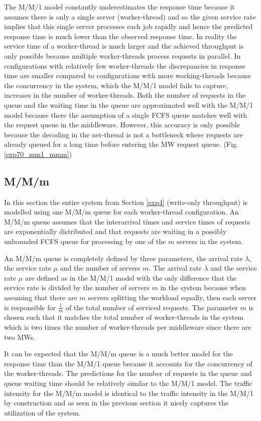 \documentclass[report.tex]{subfiles}
\begin{document}
The M/M/1 model constantly underestimates the response time because it assumes there is only a single server (worker-thread) and so the given service rate implies that this single server processes each job rapidly and hence the predicted response time is much lower than the observed response time. In reality the service time of a worker-thread is much larger and the achieved throughput is only possible because multiple worker-threads process requests in parallel.
In configurations with relatively few worker-threads the discrepancies in response time are smaller compared to configurations with more working-threads because the concurrency in the system, which the M/M/1 model fails to capture, increases in the number of worker-threads.
Both the number of requests in the queue and the waiting time in the queue are approximated well with the M/M/1 model because there the assumption of a single FCFS queue matches well with the request queue in the middleware. However, this accuracy is only possible because the decoding in the net-thread is not a bottleneck where requests are already queued for a long time before entering the MW request queue. (Fig. \ref{exp70_mm1_mmm})

\subsection{M/M/m}

In this section the entire system from Section \ref{exp4} (write-only throughput) is modelled using one M/M/m queue for each worker-thread configuration. An M/M/m queue assumes that the interarrival times and service times of requests are exponentially distributed and that requests are waiting in a possibly unbounded FCFS queue for processing by one of the $m$ servers in the system.

An M/M/m queue is completely defined by three parameters, the arrival rate $\lambda$, the service rate $\mu$ and the number of servers $m$.
The arrival rate $\lambda$ and the service rate $\mu$ are defined as in the M/M/1 model with the only difference that the service rate is divided by the number of servers $m$ in the system because when assuming that there are $m$ servers splitting the workload equally, then each server is responsible for $\frac{1}{m}$ of the total number of serviced requests. The parameter $m$ is chosen such that it matches the total number of worker-threads in the system which is two times the number of worker-threads per middleware since there are two MWs.

It can be expected that the M/M/m queue is a much better model for the response time than the M/M/1 queue because it accounts for the concurrency of the worker-threads. The predictions for the number of requests in the queue and queue waiting time should be relatively similar to the M/M/1 model. The traffic intensity for the M/M/m model is identical to the traffic intensity in the M/M/1 by construction and as seen in the previous section it nicely captures the utilization of the system.
\end{document}
